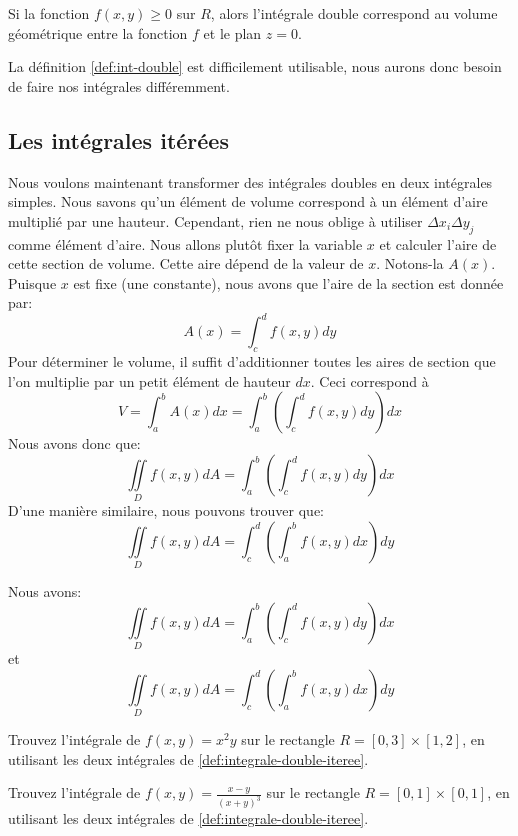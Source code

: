 \documentclass[]{book}
\theoremstyle{definition}
\theoremstyle{definition}
\theoremstyle{definition}
\theoremstyle{remark}
\let\BeginKnitrBlock\begin \let\EndKnitrBlock\end
\begin{document}
\BeginKnitrBlock{remark}
{}Si la fonction \(f(x,y)\geq 0\) sur \(R\),
alors l'intégrale double correspond au volume géométrique entre la
fonction \(f\) et le plan \(z=0\).
\EndKnitrBlock{remark}

La définition \ref{def:int-double} est difficilement utilisable, nous
aurons donc besoin de faire nos intégrales différemment.

\hypertarget{les-integrales-iterees}{%
\subsection{Les intégrales itérées}\label{les-integrales-iterees}}

Nous voulons maintenant transformer des intégrales doubles en deux
intégrales simples. Nous savons qu'un élément de volume correspond à un
élément d'aire multiplié par une hauteur. Cependant, rien ne nous oblige
à utiliser \(\Delta x_i\Delta y_j\) comme élément d'aire. Nous allons
plutôt fixer la variable \(x\) et calculer l'aire de cette section de
volume. Cette aire dépend de la valeur de \(x\). Notons-la \(A(x)\).
Puisque \(x\) est fixe (une constante), nous avons que l'aire de la
section est donnée par: \[A(x)=\int_c^{d} f(x,y)dy\] Pour déterminer le
volume, il suffit d'additionner toutes les aires de section que l'on
multiplie par un petit élément de hauteur \(dx\). Ceci correspond à
\[V=\int_a^b A(x)dx=\int_a^b\left(\int_c^{d} f(x,y)dy\right)dx\] Nous
avons donc
que:\[\iint\limits_D f(x,y) dA=\int_a^b\left(\int_c^{d} f(x,y)dy\right)dx\]
D'une manière similaire, nous pouvons trouver que:
\[\iint\limits_D f(x,y) dA=\int_c^d\left(\int_a^{b} f(x,y)dx\right)dy\]
\BeginKnitrBlock{definition}[Intégrales doubles itérées]
\protect\hypertarget{def:integrale-double-iteree}{}{\label{def:integrale-double-iteree}
{} }Nous avons:
\[\iint\limits_D f(x,y) dA=\int_a^b\left(\int_c^{d} f(x,y)dy\right)dx\]
et
\[\iint\limits_D f(x,y) dA=\int_c^d\left(\int_a^{b} f(x,y)dx\right)dy\]
\EndKnitrBlock{definition}

\BeginKnitrBlock{example}
\protect\hypertarget{exm:unnamed-chunk-241}{}{\label{exm:unnamed-chunk-241}
}Trouvez l'intégrale de \(f(x,y)=x^2y\) sur le rectangle
\(R=[0,3]\times[1,2]\), en utilisant les deux intégrales de
\ref{def:integrale-double-iteree}.
\EndKnitrBlock{example}
\vspace*{8cm}

\BeginKnitrBlock{example}
\protect\hypertarget{exm:unnamed-chunk-242}{}{\label{exm:unnamed-chunk-242}
}Trouvez l'intégrale de \(f(x,y)=\frac{x-y}{(x+y)^3}\) sur le rectangle
\(R=[0,1]\times[0,1]\), en utilisant les deux intégrales de
\ref{def:integrale-double-iteree}.
\EndKnitrBlock{example}
\vspace*{8cm}
\end{document}
